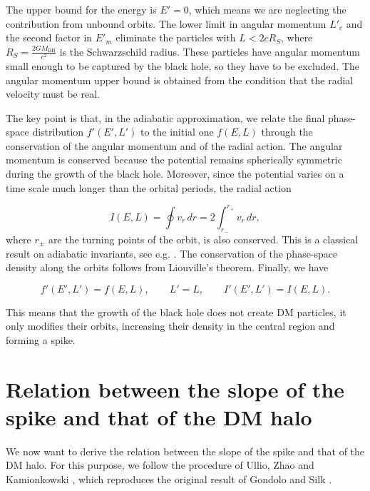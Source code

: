 The upper bound for the energy is $E'=0$, which means we are neglecting the contribution from unbound orbits. 
The lower limit in angular momentum $L'_c$ and the second factor in $E'_m$ eliminate the particles with $L < 2cR_S$, where $R_S = \frac{2GM_{\mathrm{BH}}}{c^2}$ is the Schwarzschild radius.
These particles have angular momentum small enough to be captured by
the black hole, so they have to be excluded.
The angular momentum upper bound is obtained from the condition that the radial velocity must be real.

The key point is that, in the adiabatic approximation, we relate the final
phase-space distribution $f'(E',L')$ to the initial one $f(E,L)$ through the
conservation of the angular momentum and of the radial action.
The angular momentum is conserved because the potential
remains spherically symmetric during the growth of the black hole.
Moreover, since the potential varies on a time scale much longer than
the orbital periods, the radial action

\begin{equation} \label{radialaction}
I(E,L) = \oint v_r \, dr = 2\int_{r_-}^{r_+} v_r \, dr,
\end{equation}
where $r_\pm$ are the turning points of the orbit, is also conserved. This is a classical result on adiabatic invariants, see e.g. \cite{BinneyTremaine2008}.
The conservation of the phase-space density along the orbits follows from Liouville's theorem.
Finally, we have

\begin{equation}
f'(E',L') = f(E,L), \qquad L' = L, \qquad I'(E',L') = I(E,L).
\end{equation}

This means that the growth of the black hole does not create DM particles, it only modifies their orbits, increasing their density in the central region and forming a spike. 




\section{Relation between the slope of the spike and that of the DM halo}
\label{sec:slope}


We now want to derive the relation between the slope of the spike and that of the DM halo. 
For this purpose, we follow the procedure of Ullio, Zhao and Kamionkowski \cite{Ullio_2001}, which reproduces the original
result of Gondolo and Silk \cite{Gondolo_1999}.



